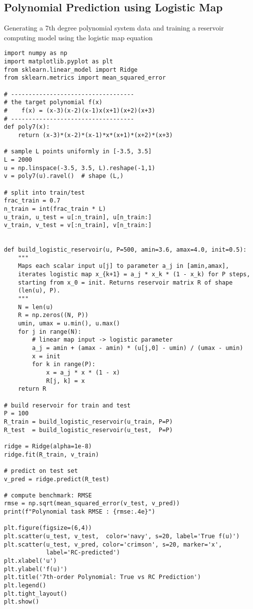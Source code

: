 \subsection*{Polynomial Prediction using Logistic Map}\label{code_logistic_polynomial}
Generating a 7th degree polynomial system data and training a reservoir computing model using the logistic map equation
\begin{verbatim}
import numpy as np
import matplotlib.pyplot as plt
from sklearn.linear_model import Ridge
from sklearn.metrics import mean_squared_error

# -----------------------------------
# the target polynomial f(x)
#    f(x) = (x-3)(x-2)(x-1)x(x+1)(x+2)(x+3)
# -----------------------------------
def poly7(x):
    return (x-3)*(x-2)*(x-1)*x*(x+1)*(x+2)*(x+3)

# sample L points uniformly in [-3.5, 3.5]
L = 2000
u = np.linspace(-3.5, 3.5, L).reshape(-1,1)
v = poly7(u).ravel()  # shape (L,)

# split into train/test
frac_train = 0.7
n_train = int(frac_train * L)
u_train, u_test = u[:n_train], u[n_train:]
v_train, v_test = v[:n_train], v[n_train:]


def build_logistic_reservoir(u, P=500, amin=3.6, amax=4.0, init=0.5):
    """
    Maps each scalar input u[j] to parameter a_j in [amin,amax],
    iterates logistic map x_{k+1} = a_j * x_k * (1 - x_k) for P steps,
    starting from x_0 = init. Returns reservoir matrix R of shape
    (len(u), P).
    """
    N = len(u)
    R = np.zeros((N, P))
    umin, umax = u.min(), u.max()
    for j in range(N):
        # linear map input -> logistic parameter
        a_j = amin + (amax - amin) * (u[j,0] - umin) / (umax - umin)
        x = init
        for k in range(P):
            x = a_j * x * (1 - x)
            R[j, k] = x
    return R

# build reservoir for train and test
P = 100
R_train = build_logistic_reservoir(u_train, P=P)
R_test  = build_logistic_reservoir(u_test,  P=P)

ridge = Ridge(alpha=1e-8)
ridge.fit(R_train, v_train)

# predict on test set
v_pred = ridge.predict(R_test)

# compute benchmark: RMSE
rmse = np.sqrt(mean_squared_error(v_test, v_pred))
print(f"Polynomial task RMSE : {rmse:.4e}")

plt.figure(figsize=(6,4))
plt.scatter(u_test, v_test,  color='navy', s=20, label='True f(u)')
plt.scatter(u_test, v_pred, color='crimson', s=20, marker='x',
            label='RC-predicted')
plt.xlabel('u')
plt.ylabel('f(u)')
plt.title('7th-order Polynomial: True vs RC Prediction')
plt.legend()
plt.tight_layout()
plt.show()

\end{verbatim}


